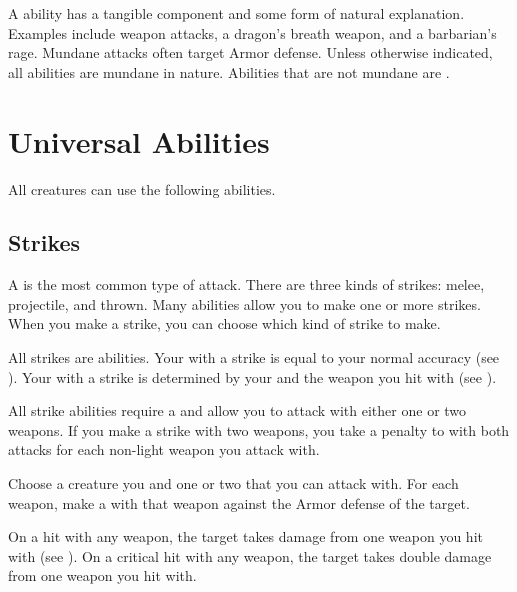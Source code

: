         \label{Mundane Abilities} A  ability has a tangible component and some form of natural explanation.
        Examples include weapon attacks, a dragon's breath weapon, and a barbarian's rage.
        Mundane attacks often target Armor defense.
        Unless otherwise indicated, all abilities are mundane in nature.
        Abilities that are not mundane are .

\section{Universal Abilities}\label{Universal Abilities}
    All creatures can use the following abilities.

    \subsection{Strikes}\label{Strikes}
        A  is the most common type of attack.
        There are three kinds of strikes: melee, projectile, and thrown.
        Many abilities allow you to make one or more strikes.
        When you make a strike, you can choose which kind of strike to make.

        All strikes are  abilities.
        Your  with a strike is equal to your normal accuracy (see ).
        Your  with a strike is determined by your  and the weapon you hit with (see ).

        \label{Two-Weapon Strikes}
        All strike abilities require a  and allow you to attack with either one or two weapons.
        If you make a strike with two weapons, you take a  penalty to  with both attacks for each non-light weapon you attack with.

        \begin{freeability}{}
            Choose a creature you  and one or two  that you can attack with.
            For each weapon, make a  with that weapon against the Armor defense of the target.

            On a hit with any weapon, the target takes damage from one weapon you hit with (see ).
            On a critical hit with any weapon, the target takes double damage from one weapon you hit with.
        \end{freeability}


